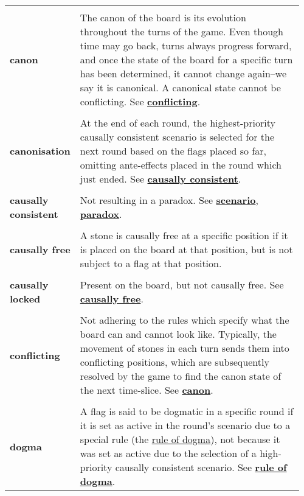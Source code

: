 {\begin{longtable}{ R{0.15\linewidth}  L{0.81\linewidth}  }
 \\* \textbf{canon} & \parbox[t]{\linewidth}{The canon of the board is its evolution throughout the turns of the game. Even though time may go back, turns always progress forward, and once the state of the board for a specific turn has been determined, it cannot change again--we say it is canonical. A canonical state cannot be conflicting. See \hyperref[glossary:conflicting]{\textbf{conflicting}}.}\\
 \\* \textbf{canonisation} & \parbox[t]{\linewidth}{At the end of each round, the highest-priority causally consistent scenario is selected for the next round based on the flags placed so far, omitting ante-effects placed in the round which just ended. See \hyperref[glossary:causally consistent]{\textbf{causally consistent}}.}\\
 \\* \textbf{causally consistent} & \parbox[t]{\linewidth}{Not resulting in a paradox. See \hyperref[glossary:scenario]{\textbf{scenario}}, \hyperref[glossary:paradox]{\textbf{paradox}}.}\\
 \\* \textbf{causally free} & \parbox[t]{\linewidth}{A stone is causally free at a specific position if it is placed on the board at that position, but is not subject to a flag at that position.}\\
 \\* \textbf{causally locked} & \parbox[t]{\linewidth}{Present on the board, but not causally free. See \hyperref[glossary:causally free]{\textbf{causally free}}.}\\
 \\* \textbf{conflicting} & \parbox[t]{\linewidth}{Not adhering to the rules which specify what the board can and cannot look like. Typically, the movement of stones in each turn sends them into conflicting positions, which are subsequently resolved by the game to find the canon state of the next time-slice. See \hyperref[glossary:canon]{\textbf{canon}}.}\\
 \\* \textbf{dogma} & \parbox[t]{\linewidth}{A flag is said to be dogmatic in a specific round if it is set as active in the round's scenario due to a special rule (the \hyperref[sec:rule of dogma]{rule of dogma}), not because it was set as active due to the selection of a high-priority causally consistent scenario. See \hyperref[glossary:rule of dogma]{\textbf{rule of dogma}}.}\\

\end{longtable}}
